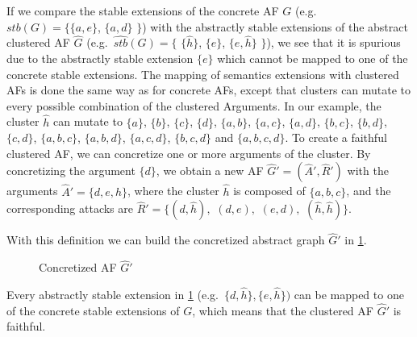 If we compare the stable extensions of the concrete AF $G$ (e.g.\ 
$stb(G)=\bigl\{\{a, e\}$, $\{a, d\}$ $\bigl\}$) with the abstractly stable extensions of the abstract clustered AF $\hat{G}$ (e.g.\ 
$\hat{stb}(G)=\bigl\{$ 
$\{\hat{h}\}$, 
$\{e\}$, 
$\{e, \hat{h}\}$ 
$\bigl\}$), 
we see that it is spurious due to the abstractly stable extension $\{e\}$ which cannot be mapped to one of the concrete stable extensions. The mapping of semantics extensions with clustered AFs is done the same way as for concrete AFs, except that clusters can mutate to every possible combination of the clustered Arguments. In our example, the cluster $\hat{h}$ can mutate to
$\{a\}$, 
$\{b\}$, 
$\{c\}$, 
$\{d\}$, 
$\{a, b\}$, 
$\{a, c\}$, 
$\{a, d\}$, 
$\{b, c\}$, 
$\{b, d\}$, 
$\{c, d\}$, 
$\{a, b, c\}$, 
$\{a, b, d\}$, 
$\{a, c, d\}$, 
$\{b, c, d\}$ and
$\{a, b, c, d\}$.
To create a faithful clustered AF, we can concretize one or more arguments of the cluster. By concretizing the argument $\{d\}$, we obtain a new AF $\hat{G}'=(\hat{A}', \hat{R}')$ with the arguments $\hat{A}'=\{d, e, \hat{h}\}$, where the cluster $\hat{h}$ is composed of $\{a, b, c\}$, and the corresponding attacks are $\hat{R}'=\{(d, \hat{h}),$
$(d, e),$
$(e, d),$
$(\hat{h}, \hat{h})\}$.

With this definition we can build the concretized abstract graph $\hat{G}'$ in \cref{af:backgroundClusterExample3}.


\begin{figure}[h]
    \centering
    \caption{Concretized AF $\hat{G}'$}
    \label{af:backgroundClusterExample3}
\end{figure}

Every abstractly stable extension in \cref{af:backgroundClusterExample3} (e.g.\ $\{d, \hat{h}\}, \{e, \hat{h}\})$ can be mapped to one of the concrete stable extensions of $G$, which means that the clustered AF $\hat{G}'$ is faithful.



